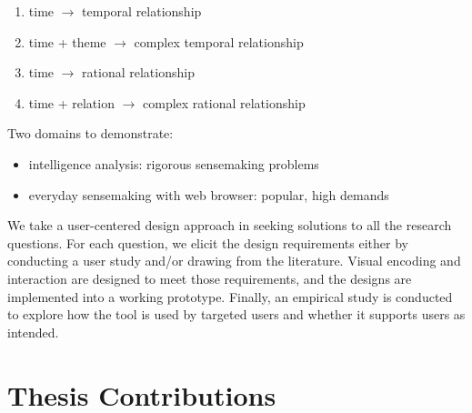 \begin{enumerate}
	\item time $\rightarrow$ temporal relationship
	\item time + theme $\rightarrow$ complex temporal relationship
	\item time $\rightarrow$ rational relationship
	\item time + relation $\rightarrow$ complex rational relationship
\end{enumerate}

Two domains to demonstrate:
\begin{itemize}
	\item intelligence analysis: rigorous sensemaking problems
	\item everyday sensemaking with web browser: popular, high demands
\end{itemize}

We take a user-centered design approach in seeking solutions to all the research questions. For each question, we elicit the design requirements either by conducting a user study and/or drawing from the literature. Visual encoding and interaction are designed to meet those requirements, and the designs are implemented into a working prototype. Finally, an empirical study is conducted to explore how the tool is used by targeted users and whether it supports users as intended. 

\section{Thesis Contributions}
%
%
%
%
%
%

